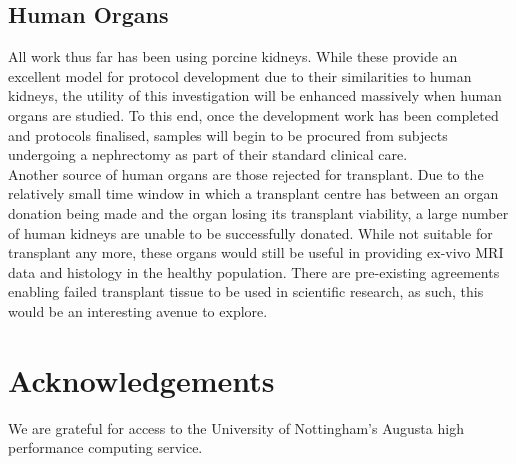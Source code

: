 \subsection{Human Organs}
All work thus far has been using porcine kidneys. While these provide an excellent model for protocol development due to their similarities to human kidneys, the utility of this investigation will be enhanced massively when human organs are studied. To this end, once the development work has been completed and protocols finalised, samples will begin to be procured from subjects undergoing a nephrectomy as part of their standard clinical care.\\

Another source of human organs are those rejected for transplant. Due to the relatively small time window in which a transplant centre has between an organ donation being made and the organ losing its transplant viability, a large number of human kidneys are unable to be successfully donated. While not suitable for transplant any more, these organs would still be useful in providing ex-vivo \ac{MRI} data and histology in the healthy population. There are pre-existing agreements enabling failed transplant tissue to be used in scientific research, as such, this would be an interesting avenue to explore.

\section{Acknowledgements}

We are grateful for access to the University of Nottingham's Augusta high performance computing service.